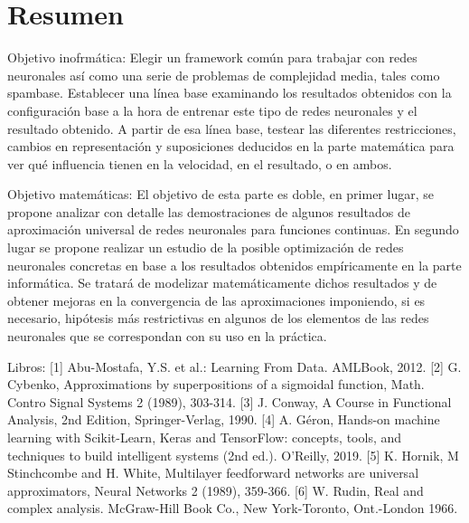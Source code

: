 %


\chapter*{Resumen}\label{ch:resumen}

Objetivo inofrmática: 
Elegir un framework común para trabajar con redes neuronales así como una serie de problemas de complejidad media, tales como spambase. Establecer una línea base examinando los resultados obtenidos con la configuración base a la hora de entrenar este tipo de redes neuronales y el resultado obtenido. A partir de esa línea base, testear las diferentes restricciones, cambios en representación y suposiciones deducidos en la parte matemática para ver qué influencia tienen en la velocidad, en el resultado, o en ambos.

Objetivo matemáticas: 
El objetivo de esta parte es doble, en primer lugar, se propone analizar con detalle las demostraciones de algunos resultados de aproximación universal de redes neuronales para funciones continuas. En segundo lugar se propone realizar un estudio de la posible optimización de redes neuronales concretas en base a los resultados obtenidos empíricamente en la parte informática.  Se tratará de modelizar matemáticamente dichos resultados y de obtener mejoras en la convergencia de las aproximaciones imponiendo, si es necesario, hipótesis más restrictivas en algunos de los elementos de las redes neuronales que se correspondan con su uso en la práctica.   

Libros: 
[1] Abu-Mostafa, Y.S. et al.: Learning From Data. AMLBook, 2012.             [2] G. Cybenko, Approximations by superpositions of a sigmoidal function, Math. Contro Signal Systems 2 (1989), 303-314.                                              [3] J. Conway, A Course in Functional Analysis,
2nd Edition, Springer-Verlag, 1990.                     [4] A. Géron, Hands-on machine learning with Scikit-Learn, Keras and TensorFlow: concepts, tools, and techniques to build intelligent systems (2nd ed.). O’Reilly, 2019.                    [5] K. Hornik, M Stinchcombe and H. White, Multilayer feedforward networks are universal approximators, Neural Networks 2 (1989), 359-366.                                  [6] W. Rudin, Real and complex analysis. McGraw-Hill Book Co., New York-Toronto, Ont.-London 1966.
